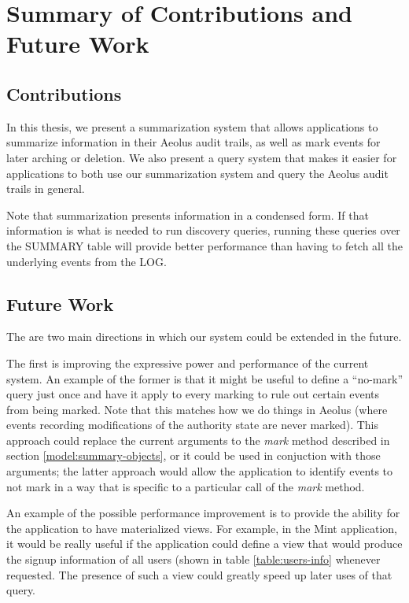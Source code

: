 \chapter{Summary of Contributions and Future Work}

\section{Contributions}

In this thesis, we present a summarization system that allows applications to summarize information in their Aeolus audit trails, as well as mark events for later arching or deletion. We also present a query system that makes it easier for applications to both use our summarization system and query the Aeolus audit trails in general.

Note that summarization presents information in a condensed form. If that information is what is needed to run discovery queries, running these queries over the SUMMARY table will provide better performance than having to fetch all the underlying events from the LOG.

\section{Future Work}

The are two main directions in which our system could be extended in the future.

The first is improving the expressive power and performance of the current system. An example of the former is that it might be useful to define a ``no-mark'' query just once and have it apply to every marking to rule out certain events from being marked. Note that this matches how we do things in Aeolus (where events recording modifications of the authority state are never marked). This approach could replace the current arguments to the \emph{mark} method described in section \ref{model:summary-objects}, or it could be used in conjuction with those arguments; the latter approach would allow the application to identify events to not mark in a way that is specific to a particular call of the \emph{mark} method.

An example of the possible performance improvement is to provide the ability for the application to have materialized views. For example, in the Mint application, it would be really useful if the application could define a view that would produce the signup information of all users (shown in table \ref{table:users-info} whenever requested. The presence of such a view could greatly speed up later uses of that query.

